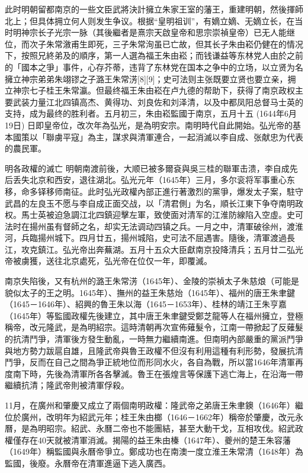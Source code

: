 此时明朝留都南京的一些文臣武將決計擁立朱家王室的藩王，重建明朝，然後揮師北上；但具体拥立何人则发生争议。根据“皇明祖训”，有嫡立嫡、无嫡立长，在当时明神宗长子光宗一脉（其後繼者是熹宗天啟皇帝和思宗崇禎皇帝）已无人能继位，而次子朱常漵甫生即死，三子朱常洵虽已亡故，但其长子朱由崧仍健在的情况下，按照兄終弟及的順序，第一人選為福王朱由崧；而钱谦益等东林党人由於之前的「國本之爭」事件，心存芥蒂，违背了东林党在国本之争中的立场，以立贤为名擁立神宗弟弟朱翊镠之子潞王朱常淓[8][9]；史可法则主张既要立贤也要立亲，拥立神宗七子桂王朱常瀛。但最终福王朱由崧在卢九德的帮助下，获得了南京政权主要武装力量江北四镇高杰、黄得功、刘良佐和刘泽清，以及中都凤阳总督马士英的支持，成为最终的胜利者。五月初三，朱由崧監國于南京，五月十五 (1644年6月19日) 日即皇帝位，改次年為弘光，是為明安宗。南明時代自此開始。弘光帝的基本國策以「聯虜平寇」為主，謀求與清軍連合，一起消滅以李自成、张献忠为代表的農民軍。

明各政權的滅亡
明朝南渡前後，大顺已被多爾袞與吳三桂的聯軍击溃，李自成先后丢失北京和西安，退往湖北。弘光元年（1645年）三月，多尔衮将军事重心东移，命多铎移师南征。此时弘光政權內部正進行著激烈的黨爭，爆发太子案，駐守武昌的左良玉不愿与李自成正面交战，以「清君側」为名，順长江東下争夺南明政权。馬士英被迫急調江北四鎮迎擊左軍，致使面对清军的江淮防線陷入空虛。史可法时在揚州虽有督師之名，却实无法调动四镇之兵。一月之中，清軍破徐州，渡淮河，兵臨揚州城下。四月廿五，揚州城陷，史可法不屈遇害。隨後，清軍渡過長江，攻克鎮江。弘光帝出奔蕪湖。五月十五众大臣獻南京投降清兵；五月廿二弘光帝被虜獲，送往北京處死，弘光帝在位仅一年，即覆滅。

南京失陷後，又有杭州的潞王朱常淓（1645年）、金陵的崇禎太子朱慈烺（可能是貌似太子的王之明。1645年）、撫州的益王朱慈炲（1645年）、福州的唐王朱聿鍵（1645－1646年）、紹興的魯王朱以海（1645－1653年）、桂林的靖江王朱亨嘉（1645年）等監國政權先後建立，其中唐王朱聿鍵受鄭芝龍等人在福州擁立，登極稱帝，改元隆武，是為明紹宗。這時清朝再次宣佈薙髮令，江南一帶掀起了反薙髮的抗清鬥爭，清軍後方發生動亂，一時無力繼續南進。但南明內部嚴重的黨派鬥爭與地方勢力跋扈自雄，且隆武帝與魯王政權不但沒有利用這種有利形勢，發展抗清鬥爭，反而在自己之間為爭正統地位而形同水火，各自為戰，所以當1646年清軍再度南下時，先後為清軍所各各擊滅。魯王在張煌言等保護下逃亡海上，在沿海一帶繼續抗清；隆武帝則被清軍俘殺。

11月，在廣州和肇慶又成立了兩個南明政權：隆武帝之弟唐王朱聿鐭（1646年）繼位於廣州，改明年为紹武元年；桂王朱由榔（1646－1662年）稱帝於肇慶，改元永曆，是為明昭宗。紹武、永曆二帝也不能團結，甚至大動干戈，互相攻伐。紹武政權僅存在40天就被清軍消滅。揭陽的益王朱由榛（1647年）、夔州的楚王朱容藩（1649年）稱監國與永曆帝爭立。鄭成功也在南澳一度立淮王朱常清（1648年）為監國，後廢。永曆帝在清軍進逼下逃入廣西。


